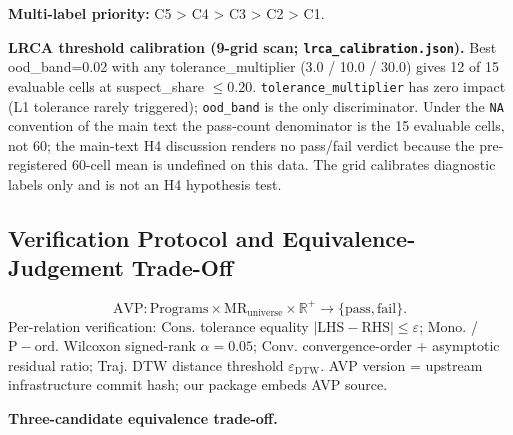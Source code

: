 \documentclass[review,12pt,authoryear]{elsarticle}
\begin{document}
\textbf{Multi-label priority:} C5 \textgreater{} C4 \textgreater{} C3
\textgreater{} C2 \textgreater{} C1.

\textbf{LRCA threshold calibration (9-grid scan;
\texttt{lrca\_calibration.json}).} Best ood\_band=0.02 with any
tolerance\_multiplier (3.0 / 10.0 / 30.0) gives 12 of 15 evaluable
cells at suspect\_share $\leq 0.20$.
\texttt{tolerance\_multiplier} has zero impact (L1 tolerance
rarely triggered); \texttt{ood\_band} is the only discriminator. Under
the \texttt{NA} convention of the main text the pass-count denominator
is the 15 evaluable cells, not 60; the main-text H4 discussion renders
no pass/fail verdict because the pre-registered 60-cell mean is
undefined on this data. The grid calibrates diagnostic labels only and
is not an H4 hypothesis test.

\subsection{Verification Protocol and Equivalence-Judgement Trade-Off}\label{a.3-avp-protocol-specification-and-equivalence-judgement-trade-off}

\[
\mathrm{AVP}: \mathrm{Programs} \times \mathrm{MR}_{\mathrm{universe}} \times \mathbb{R}^{+} \to \{\mathrm{pass}, \mathrm{fail}\}.
\]
Per-relation verification: $\mathrm{Cons.}$ tolerance equality $|\mathrm{LHS} -
\mathrm{RHS}| \leq \varepsilon$; $\mathrm{Mono.}$ / $\mathrm{P-ord.}$ Wilcoxon signed-rank $\alpha=0.05$; $\mathrm{Conv.}$
convergence-order + asymptotic residual ratio; Traj. DTW distance
threshold $\varepsilon_{\mathrm{DTW}}$. AVP version = upstream infrastructure commit hash; our package embeds
AVP source.

\textbf{Three-candidate equivalence trade-off.}
\end{document}
